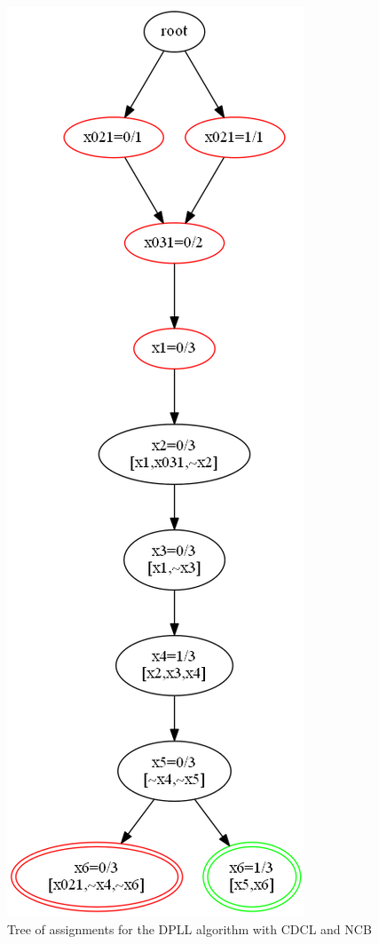 \documentclass[11pt]{article}
\begin{document}
\begin{figure}
\begin{center}
\includegraphics[keepaspectratio=true,height=.9\textheight]{tree3}
\end{center}
\caption{Tree of assignments for the DPLL algorithm with CDCL and NCB}\label{tree3}
\end{figure}


\newpage



\end{document}
